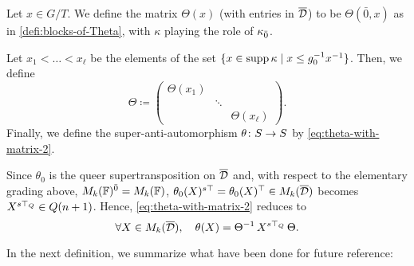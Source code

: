 \begin{defi}\label{defi:blocks-of-Theta-odd}
    Let $x \in G/T$. 
    We define the matrix $\Theta(x)$ (with entries in $\barr \D$) to be $\Theta(\bar 0, x)$ as in \cref{defi:blocks-of-Theta}, with $\kappa$ playing the role of $\kappa_{\bar{0}}$. 
\end{defi}

Let $x_1 < \ldots < x_{\ell}$ be the elements of the set $\{ x \in \operatorname{supp} \kappa \mid x \leq g_0^{-1} x^{-1} \}$. 
Then, we define 
\[\label{eq:puting-the-blocks-of-Phi-together-version-Q}
    \Theta \coloneqq
    \begin{pmatrix}
        \Theta(x_1)&& \\
        & \ddots &\\
        && \Theta(x_{\ell})
    \end{pmatrix}.
\]
%
Finally, we define the super-anti-automorphism $\theta\colon S\to S$ by \cref{eq:theta-with-matrix-2}. 

Since $\theta_0$ is the queer supertransposition on $\barr \D$ and, with respect to the elementary grading above, $M_{k}(\mathbb{F})^{\bar0} = M_{k}(\mathbb{F})$, $\theta_0(X)\stransp = \theta_0(X)\transp \in M_{k} (\barr \D)$ becomes $X^{s\top_Q} \in Q(n+1)$. 
Hence, \cref{eq:theta-with-matrix-2} reduces to 
\[\label{eq:theta-with-matrix-4}
    \forall X\in M_{k} (\barr \D), \quad \theta(X) = \Theta\inv\, X\sTq\, \Theta.
\]

In the next definition, we summarize what have been done for future reference:

